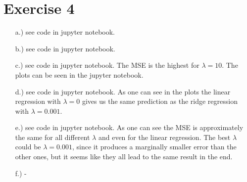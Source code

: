 \documentclass[%
   10pt,              %
   a4paper,           %
   DIV10,             %
]{scrartcl}%
\begin{document}
\section*{Exercise 4}
\begin{itemize}
	\item[a.)] see code in jupyter notebook.
	\item[b.)] see code in jupyter notebook.
	\item[c.)] see code in jupyter notebook. The MSE is the highest for $\lambda = 10$. The plots can be seen in the jupyter notebook. 
	\item[d.)] see code in jupyter notebook. As one can see in the plots the linear regression with $\lambda = 0$ gives us the same prediction as the ridge regression with $\lambda = 0.001$.
	\item[e.)] see code in jupyter notebook. As one can see the MSE is approximately the same for all different $\lambda$ and even for the linear regression. The best $\lambda$ could be $\lambda = 0.001$, since it produces a marginally smaller error than the other ones, but it seems like they all lead to the same result in the end.
	\item[f.)] - 
\end{itemize}
\end{document}
